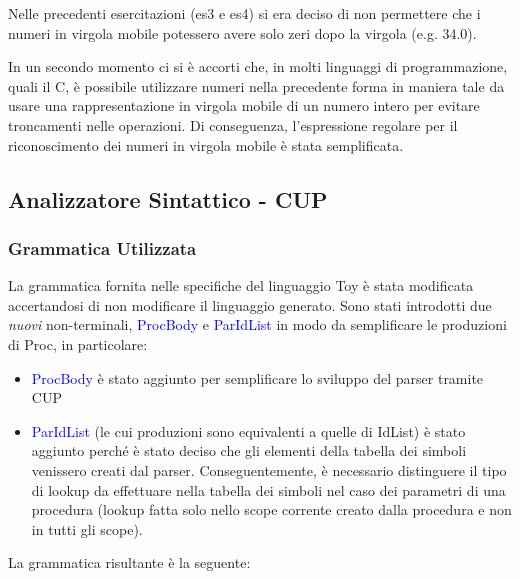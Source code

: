 \documentclass[a4paper,12pt]{article}
\begin{document}
   Nelle precedenti esercitazioni (es3 e es4) si era deciso di non permettere che i numeri in virgola mobile potessero avere solo zeri dopo la virgola (e.g. 34.0).

   In un secondo momento ci si è accorti che, in molti linguaggi di programmazione, quali il C, è possibile utilizzare numeri nella precedente forma in maniera tale da 
   usare una rappresentazione in virgola mobile di un numero intero per evitare troncamenti nelle operazioni.
   Di conseguenza, l'espressione regolare per il riconoscimento dei numeri in virgola mobile è stata semplificata.

	
	\subsection{Analizzatore Sintattico - CUP}

	\subsubsection{Grammatica Utilizzata}
	La grammatica fornita nelle specifiche del linguaggio Toy è stata modificata accertandosi di non modificare il linguaggio generato.
	Sono stati introdotti due \emph{nuovi} non-terminali, \textcolor{blue}{ProcBody} e \textcolor{blue}{ParIdList}
	in modo da semplificare le produzioni di Proc, in particolare:
	
    \begin{itemize}
	\item \textcolor{blue}{ProcBody} è stato aggiunto per semplificare lo sviluppo del parser tramite CUP
	\item \textcolor{blue}{ParIdList} (le cui produzioni sono equivalenti a quelle di IdList) è stato aggiunto perché è stato deciso che gli elementi della tabella dei simboli
            venissero creati dal parser. Conseguentemente, è necessario distinguere il tipo di lookup da effettuare nella tabella dei simboli nel caso dei parametri
            di una procedura (lookup fatta solo nello scope corrente creato dalla procedura e non in tutti gli scope).
	\end{itemize}
	La grammatica risultante è la seguente:\newline
\end{document}
